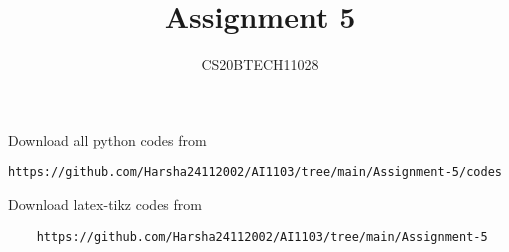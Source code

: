 \documentclass[journal,12pt,twocolumn]{IEEEtran}
\DeclareMathOperator*{\Res}{Res}
\begin{document}
\newcommand{\BEQA}{\begin{eqnarray}}
\newcommand{\EEQA}{\end{eqnarray}}
\newcommand{\define}{\stackrel{\triangle}{=}}

\raggedbottom
\setlength{\parindent}{0pt}
\providecommand{\mbf}{\mathbf}
\providecommand{\pr}[1]{\ensuremath{\Pr\left(#1\right)}}
\providecommand{\qfunc}[1]{\ensuremath{Q\left(#1\right)}}
\providecommand{\sbrak}[1]{\ensuremath{{}\left[#1\right]}}
\providecommand{\lsbrak}[1]{\ensuremath{{}\left[#1\right.}}
\providecommand{\rsbrak}[1]{\ensuremath{{}\left.#1\right]}}
\providecommand{\brak}[1]{\ensuremath{\left(#1\right)}}
\providecommand{\lbrak}[1]{\ensuremath{\left(#1\right.}}
\providecommand{\rbrak}[1]{\ensuremath{\left.#1\right)}}
\providecommand{\cbrak}[1]{\ensuremath{\left\{#1\right\}}}
\providecommand{\lcbrak}[1]{\ensuremath{\left\{#1\right.}}
\providecommand{\rcbrak}[1]{\ensuremath{\left.#1\right\}}}
\theoremstyle{remark}
\newtheorem{rem}{Remark}
\newcommand{\sgn}{\mathop{\mathrm{sgn}}}
\providecommand{\abs}[1]{\vert#1\vert}
\providecommand{\res}[1]{\Res\displaylimits_{#1}} 
\providecommand{\norm}[1]{\lVert#1\rVert}
\providecommand{\mtx}[1]{\mathbf{#1}}
\providecommand{\mean}[1]{E[ #1 ]}
\providecommand{\fourier}{\overset{\mathcal{F}}{ \rightleftharpoons}}
\providecommand{\system}{\overset{\mathcal{H}}{ \longleftrightarrow}}
\newcommand{\solution}{\noindent \textbf{Solution: }}
\newcommand{\cosec}{\,\text{cosec}\,}
\providecommand{\dec}[2]{\ensuremath{\overset{#1}{\underset{#2}{\gtrless}}}}
\newcommand{\myvec}[1]{\ensuremath{\begin{pmatrix}#1\end{pmatrix}}}
\newcommand{\mydet}[1]{\ensuremath{\begin{vmatrix}#1\end{vmatrix}}}
\makeatletter
{}
\makeatother
\let\StandardTheFigure\thefigure
\let\vec\mathbf
\renewcommand{\thefigure}{\theproblem}
\def\putbox#1#2#3{\makebox[0in][l]{\makebox[#1][l]{}\raisebox{\baselineskip}[0in][0in]{\raisebox{#2}[0in][0in]{#3}}}}
     \def\rightbox#1{\makebox[0in][r]{#1}}
     \def\centbox#1{\makebox[0in]{#1}}
     \def\topbox#1{\raisebox{-\baselineskip}[0in][0in]{#1}}
     \def\midbox#1{\raisebox{-0.5\baselineskip}[0in][0in]{#1}}
\vspace{3cm}
\title{Assignment 5}
\author{CS20BTECH11028}
\maketitle
\newpage
\bigskip
\renewcommand{\thefigure}{\theenumi}
\renewcommand{\thetable}{\theenumi}
Download all python codes from 
\begin{lstlisting}
https://github.com/Harsha24112002/AI1103/tree/main/Assignment-5/codes
\end{lstlisting}
Download latex-tikz codes from 
%
\begin{lstlisting}
    https://github.com/Harsha24112002/AI1103/tree/main/Assignment-5
\end{lstlisting}
\end{document}
